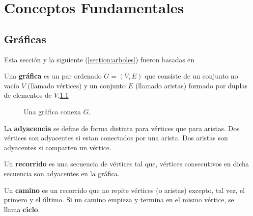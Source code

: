 \chapter{Conceptos Fundamentales}

\section{Gr\'aficas}

Esta secci\'on y la siguiente (\ref{section:arboles}) fueron basadas en \cite{open}

\begin{definition}[Gr\'afica]
Una \textbf{gr\'afica} es un par ordenado $G=(V, E)$ que consiste de un conjunto no vac\'io $V$ (llamado v\'ertices) y un conjunto $E$ (llamado aristas) formado por duplas de elementos de $V$.\ref{fig:graph}
\end{definition}

\begin{figure}
\centering
  \caption{Una gr\'afica conexa $G$.}\label{fig:graph}
\end{figure}

\begin{definition}[Adyacencia]
La \textbf{adyacencia} se define de forma distinta para v\'ertices que para aristas. Dos v\'ertices son adyacentes si estan conectados por una arista. Dos aristas son adyacentes si comparten un v\'ertice.
\end{definition}

\begin{definition}[Recorrido]
Un \textbf{recorrido} es una secuencia de v\'ertices tal que, v\'ertices consecutivos en dicha secuencia son adyacentes en la gr\'afica.
\end{definition}

\begin{definition}[Camino]
Un \textbf{camino} es un recorrido que no repite v\'ertices (o aristas) excepto, tal vez, el primero y el \'ultimo. Si un camino empieza y termina en el mismo v\'ertice, se llama \textbf{ciclo}.
\end{definition}


